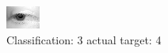 \begin{figure}[h!]
\begin{center}
\includegraphics[width=0.60\columnwidth]{figures/ID2661_class_3_target_4.png}
\end{center}
\caption{ Classification: 3 actual target: 4}
\label{fig:ID2661_class_3_target_4}
\end{figure}
